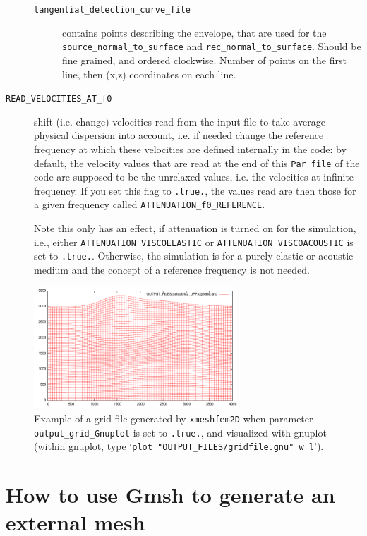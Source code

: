 \begin{description}
\begin{description}
     \item[{\texttt{tangential\_detection\_curve\_file}}] contains points describing the envelope, that are used for the \texttt{source\_normal\_to\_surface} and \texttt{rec\_normal\_to\_surface}. Should be fine grained, and ordered clockwise. Number of points on the first line, then (x,z) coordinates on each line.
  \end{description}


\item[{\texttt{READ\_VELOCITIES\_AT\_f0}}]
 shift (i.e. change) velocities read from the input file to take average physical dispersion into account, i.e. if needed change the reference frequency at which these velocities are defined internally in the code: by default, the velocity values that are read at the end of this \texttt{Par\_file} of the code are supposed to be the unrelaxed values, i.e. the velocities at infinite frequency. If you set this flag to \texttt{.true.}, the values read are then those for a given frequency called \texttt{ATTENUATION\_f0\_REFERENCE}.

Note this only has an effect, if attenuation is turned on for the simulation, i.e., either \texttt{ATTENUATION\_VISCOELASTIC} or \texttt{ATTENUATION\_VISCOACOUSTIC} is set to \texttt{.true.}. Otherwise, the simulation is for a purely elastic or acoustic medium and the concept of a reference frequency is not needed.

\end{description}



\begin{figure}[htbp]
\centering
\includegraphics[width=3in]{figures/example-gridfile.pdf}
\caption{Example of a grid file generated by \texttt{xmeshfem2D} when parameter \texttt{output\_grid\_Gnuplot} is set to \texttt{.true.}, and visualized with gnuplot
(within gnuplot, type `\texttt{plot "OUTPUT\_FILES/gridfile.gnu" w l}').}
\label{fig:example.mesh}
\end{figure}


\section{How to use Gmsh to generate an external mesh}

